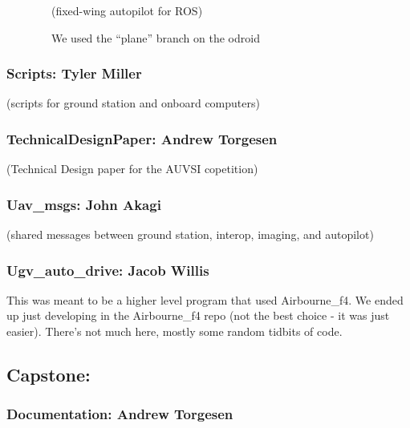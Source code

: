 {~~~~~~~~(fixed-wing autopilot for ROS)}

{~~~~~~~~We used the ``plane'' branch on the odroid}

{}

\hypertarget{h.hbcl1x4i3t9h}{\subsubsection{\texorpdfstring{{Scripts:
Tyler Miller}}{Scripts: Tyler Miller}}\label{h.hbcl1x4i3t9h}}

{(scripts for ground station and onboard computers)}

\hypertarget{h.6tkhkdxr0376}{\subsubsection{\texorpdfstring{{TechnicalDesignPaper:
Andrew
Torgesen}}{TechnicalDesignPaper: Andrew Torgesen}}\label{h.6tkhkdxr0376}}

{(Technical Design paper for the AUVSI copetition)}

\hypertarget{h.gpyymqyjiqy0}{\subsubsection{\texorpdfstring{{Uav\_msgs:
John Akagi}}{Uav\_msgs: John Akagi}}\label{h.gpyymqyjiqy0}}

{(shared messages between ground station, interop, imaging, and
autopilot)}

\hypertarget{h.lnuk2wx0zogg}{\subsubsection{\texorpdfstring{{Ugv\_auto\_drive:
Jacob Willis}}{Ugv\_auto\_drive: Jacob Willis}}\label{h.lnuk2wx0zogg}}

{This was meant to be a higher level program that used Airbourne\_f4. We
ended up just developing in the Airbourne\_f4 repo (not the best choice
- it was just easier). There's not much here, mostly some random tidbits
of code.}

\hypertarget{h.d645jwbpz1js}{\subsection{\texorpdfstring{{Capstone:}}{Capstone:}}\label{h.d645jwbpz1js}}

\hypertarget{h.p8pvzhwgals7}{\subsubsection{\texorpdfstring{{Documentation:
Andrew
Torgesen}}{Documentation: Andrew Torgesen}}\label{h.p8pvzhwgals7}}

